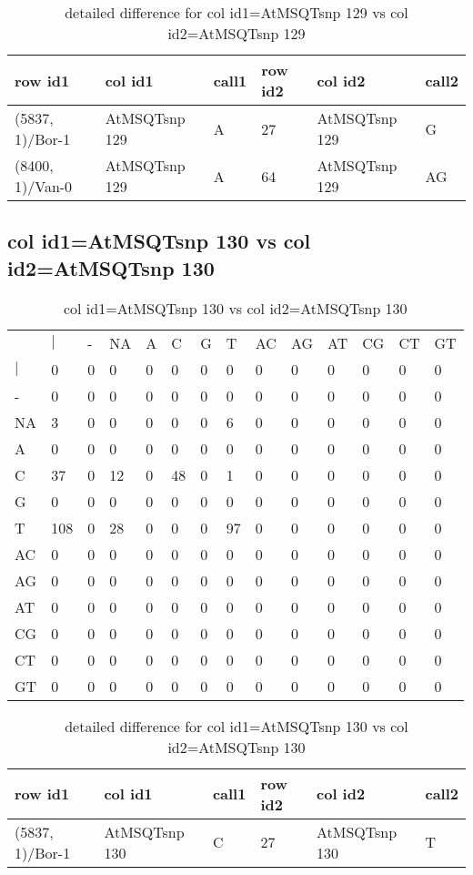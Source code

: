 \begin{center}
\begin{longtable}{|l|l|l|l|l|l|}
\caption{detailed difference for col id1=AtMSQTsnp 129 vs col id2=AtMSQTsnp 129} \label{table_dm707}\\
\hline
row id1&col id1&call1&row id2&col id2&call2\\
\hline
(5837, 1)/Bor-1&AtMSQTsnp 129&A&27&AtMSQTsnp 129&G\\
(8400, 1)/Van-0&AtMSQTsnp 129&A&64&AtMSQTsnp 129&AG\\
\hline
\end{longtable}
\end{center}

\subsection{col id1=AtMSQTsnp 130 vs col id2=AtMSQTsnp 130}
\begin{center}
\begin{longtable}{|l|l|l|l|l|l|l|l|l|l|l|l|l|l|}
\caption{col id1=AtMSQTsnp 130 vs col id2=AtMSQTsnp 130} \label{table_dm708}\\
\hline
\\
\hline
&$|$&-&NA&A&C&G&T&AC&AG&AT&CG&CT&GT\\
$|$&0&0&0&0&0&0&0&0&0&0&0&0&0\\
-&0&0&0&0&0&0&0&0&0&0&0&0&0\\
NA&3&0&0&0&0&0&6&0&0&0&0&0&0\\
A&0&0&0&0&0&0&0&0&0&0&0&0&0\\
C&37&0&12&0&48&0&1&0&0&0&0&0&0\\
G&0&0&0&0&0&0&0&0&0&0&0&0&0\\
T&108&0&28&0&0&0&97&0&0&0&0&0&0\\
AC&0&0&0&0&0&0&0&0&0&0&0&0&0\\
AG&0&0&0&0&0&0&0&0&0&0&0&0&0\\
AT&0&0&0&0&0&0&0&0&0&0&0&0&0\\
CG&0&0&0&0&0&0&0&0&0&0&0&0&0\\
CT&0&0&0&0&0&0&0&0&0&0&0&0&0\\
GT&0&0&0&0&0&0&0&0&0&0&0&0&0\\
\hline
\end{longtable}
\end{center}

\begin{center}
\begin{longtable}{|l|l|l|l|l|l|}
\caption{detailed difference for col id1=AtMSQTsnp 130 vs col id2=AtMSQTsnp 130} \label{table_dm709}\\
\hline
row id1&col id1&call1&row id2&col id2&call2\\
\hline
(5837, 1)/Bor-1&AtMSQTsnp 130&C&27&AtMSQTsnp 130&T\\
\hline
\end{longtable}
\end{center}

